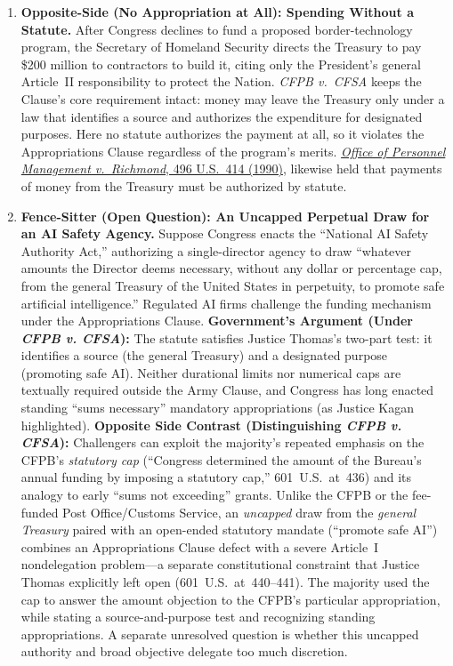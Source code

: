 \documentclass[12pt]{article}
\begin{document}
\begin{enumerate}
\item \textbf{Opposite-Side (No Appropriation at All): Spending Without a Statute.} After Congress declines to fund a proposed border-technology program, the Secretary of Homeland Security directs the Treasury to pay \$200 million to contractors to build it, citing only the President's general Article~II responsibility to protect the Nation. \textit{CFPB v.\ CFSA} keeps the Clause's core requirement intact: money may leave the Treasury only under a law that identifies a source and authorizes the expenditure for designated purposes. Here no statute authorizes the payment at all, so it violates the Appropriations Clause regardless of the program's merits. \href{https://supreme.justia.com/cases/federal/us/496/414/}{\textit{Office of Personnel Management v.\ Richmond}, 496 U.S.\ 414 (1990)}, likewise held that payments of money from the Treasury must be authorized by statute.

\item \textbf{Fence-Sitter (Open Question): An Uncapped Perpetual Draw for an AI Safety Agency.} Suppose Congress enacts the ``National AI Safety Authority Act,'' authorizing a single-director agency to draw ``whatever amounts the Director deems necessary, without any dollar or percentage cap, from the general Treasury of the United States in perpetuity, to promote safe artificial intelligence.'' Regulated AI firms challenge the funding mechanism under the Appropriations Clause. \textbf{Government's Argument (Under \textit{CFPB v. CFSA}):} The statute satisfies Justice Thomas's two-part test: it identifies a source (the general Treasury) and a designated purpose (promoting safe AI). Neither durational limits nor numerical caps are textually required outside the Army Clause, and Congress has long enacted standing ``sums necessary'' mandatory appropriations (as Justice Kagan highlighted). \textbf{Opposite Side Contrast (Distinguishing \textit{CFPB v. CFSA}):} Challengers can exploit the majority's repeated emphasis on the CFPB's \textit{statutory cap} (``Congress determined the amount of the Bureau's annual funding by imposing a statutory cap,'' 601~U.S.~at~436) and its analogy to early ``sums not exceeding'' grants. Unlike the CFPB or the fee-funded Post Office/Customs Service, an \textit{uncapped} draw from the \textit{general Treasury} paired with an open-ended statutory mandate (``promote safe AI'') combines an Appropriations Clause defect with a severe Article~I nondelegation problem---a separate constitutional constraint that Justice Thomas explicitly left open (601~U.S.~at~440--441). The majority used the cap to answer the amount objection to the CFPB's particular appropriation, while stating a source-and-purpose test and recognizing standing appropriations. A separate unresolved question is whether this uncapped authority and broad objective delegate too much discretion.

\end{enumerate}
\end{document}
